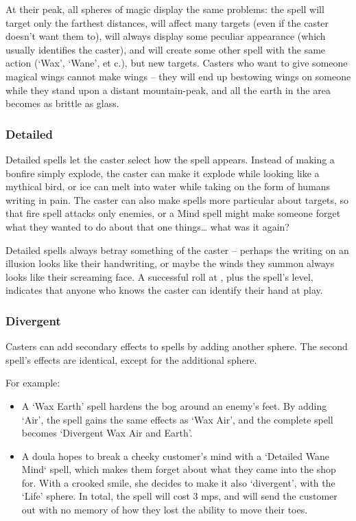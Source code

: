 \begin{multicols}{2}
At their peak, all spheres of magic display the same problems: the spell will target only the farthest distances, will affect many targets (even if the caster doesn't want them to), will always display some peculiar appearance (which usually identifies the caster), and will create some other spell with the same action (`Wax', `Wane', et c.), but new targets.
Casters who want to give someone magical wings cannot make wings -- they will end up bestowing wings on someone while they stand upon a distant mountain-peak, and all the earth in the area becomes as brittle as glass.

\subsubsection{Detailed}

Detailed spells let the caster select how the spell appears.
Instead of making a bonfire simply explode, the caster can make it explode while looking like a mythical bird, or ice can melt into water while taking on the form of humans writing in pain.
The caster can also make spells more particular about targets, so that fire spell attacks only enemies, or a Mind spell might make someone forget what they wanted to do about that one things\ldots{} what was it again?

Detailed spells always betray something of the caster -- perhaps the writing on an illusion looks like their handwriting, or maybe the winds they summon always looks like their screaming face.
A successful  roll at \tn[7], plus the spell's level, indicates that anyone who knows the caster can identify their hand at play.

\subsubsection{Divergent}

Casters can add secondary effects to spells by adding another sphere.
The second spell's effects are identical, except for the additional sphere.

For example:

\begin{itemize}
  \item
  A `Wax Earth' spell hardens the bog around an enemy's feet.
  By adding `Air', the spell gains the same effects as `Wax Air', and the complete spell becomes `Divergent Wax Air and Earth'.
  \item
  A doula hopes to break a cheeky customer's mind with a `Detailed Wane Mind` spell, which makes them forget about what they came into the shop for.
  With a crooked smile, she decides to make it also `divergent', with the `Life' sphere.
  In total, the spell will cost 3 \glspl{mp}, and will send the customer out with no memory of how they lost the ability to move their toes.
\end{itemize}


\end{multicols}
